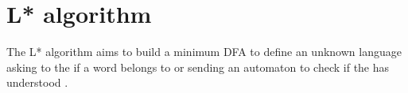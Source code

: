 \section{L* algorithm}

The L* algorithm aims to build a minimum DFA to define an unknown language \langU{} asking to the \teacher{} if a word belongs to \langU{} or sending an automaton \automaton{} to check if the \lerner{} has understood \langU{}.